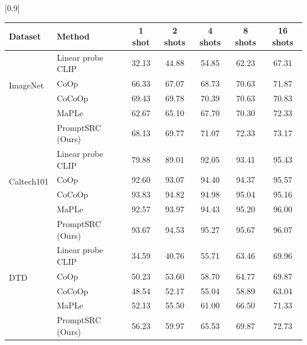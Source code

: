 
\begin{table}[t!]
    \small \centering
 \setlength{\tabcolsep}{15pt}
    \scalebox{0.9}[0.9]{
\begin{tabular}{ll|ccccc}
\toprule
\textbf{Dataset} & 
 \textbf{Method} & 
\textbf{1 shot} &
\textbf{2 shots} & 
\textbf{4 shots} & 
\textbf{ 8 shots} &
\textbf{16 shots} \\  \midrule

\multirow{4}{*}{ImageNet}      & Linear probe CLIP      &32.13	&44.88&	54.85	&62.23	&67.31\\ 
                               & CoOp                   &66.33	&67.07	&68.73	&70.63&	71.87\\ 
                               & CoCoOp                  & 69.43	&69.78	&70.39&	70.63&	70.83\\
                                                              & MaPLe                  & 62.67	&65.10	&67.70&	70.30&	72.33\\
                             \rowcolor{tabhighlight}   &  PromptSRC (Ours)              & 68.13	&69.77	&71.07	&72.33	&73.17\\
\midrule
\multirow{4}{*}{Caltech101}    & Linear probe CLIP      & 79.88	&89.01	&92.05	&93.41	&95.43\\
                               & CoOp                    & 92.60	&93.07	&94.40	&94.37	&95.57\\
                               & CoCoOp                  & 93.83	&94.82	&94.98	&95.04	&95.16\\
                                                              & MaPLe                  & 92.57	&93.97	&94.43&	95.20&	96.00\\
                               \rowcolor{tabhighlight} &  PromptSRC (Ours)                 &93.67	&94.53	&95.27	&95.67	&96.07\\
                               \midrule
\multirow{4}{*}{DTD}           & Linear probe CLIP       & 34.59	&40.76	&55.71	&63.46	&69.96\\
                               & CoOp                   &50.23&	53.60	&58.70	&64.77	&69.87\\
                               & CoCoOp                      & 48.54	&52.17	&55.04	&58.89	&63.04\\
                                                              & MaPLe                  & 52.13	&55.50	&61.00&	66.50&	71.33\\
                               \rowcolor{tabhighlight} &  PromptSRC  (Ours)                & 56.23&59.97	&65.53	&69.87	&72.73\\

\end{tabular}}
\end{table}
